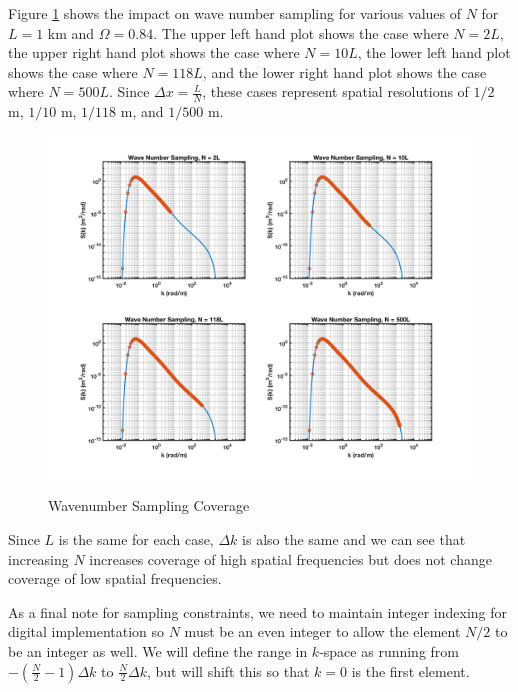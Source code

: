 Figure \ref{os_fig:6aa} shows the impact on wave number sampling for various values of $N$ for $L = 1$ km and $\Omega = 0.84$. The upper left hand plot shows the case where $N = 2L$, the upper right hand plot shows the case where $N = 10L$, the lower left hand plot shows the case where $N = 118L$, and the lower right hand plot shows the case where $N = 500L$. Since $\Delta x = \frac{L}{N}$, these cases represent spatial resolutions of $1/2$ m, $1/10$ m, $1/118$ m, and $1/500$ m. 
\begin{figure}[H]
  \begin{center}
\includegraphics[width=6in]{../media/Ocean_Surface/sampling_coverage.png}
  \end{center}
  \renewcommand{\baselinestretch}{1} \small\normalsize
  \begin{quote}
    \caption[Wavenumber Sampling Coverage]{Wavenumber Sampling Coverage\label{os_fig:6aa}}
  \end{quote}
\end{figure}
\renewcommand{\baselinestretch}{2} \small\normalsize
Since $L$ is the same for each case, $\Delta k$ is also the same and we can see that increasing $N$ increases coverage of high spatial frequencies but does not change coverage of low spatial frequencies.

As a final note for sampling constraints, we need to maintain integer indexing for digital implementation so $N$ must be an even integer to allow the element $N/2$ to be an integer as well. We will define the range in $k$-space as running from $-\left(\frac{N}{2}-1\right)\Delta k$ to $\frac{N}{2}\Delta k$, but will shift this so that $k = 0 $ is the first element.

